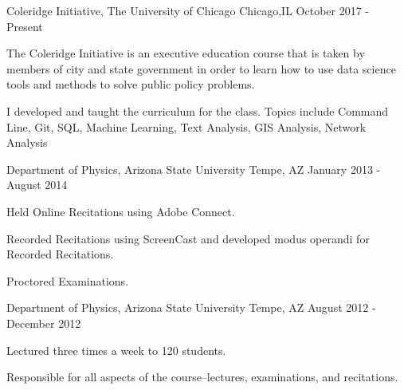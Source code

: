 

\begin{cventries}


    {Coleridge Initiative, The University of Chicago} %
    {Chicago,IL} %
    {October 2017 - Present} %
    {\begin{cvitems}\item {The Coleridge Initiative is an executive education course that is taken by members of city and state government in order to learn how to use data science tools and methods to solve public policy problems.}\item {I developed and taught the curriculum for the class. Topics include Command Line, Git, SQL, Machine Learning, Text Analysis, GIS Analysis, Network Analysis}\end{cvitems}}


    {Department of Physics, Arizona State University} %
    {Tempe, AZ} %
    {January 2013 - August 2014} %
    {
      \begin{cvitems} %
        \item {Held Online Recitations using Adobe Connect.}
        \item {Recorded Recitations using ScreenCast and developed modus operandi for Recorded Recitations.}
        \item {Proctored Examinations.}
      \end{cvitems}
    }

    {Department of Physics, Arizona State University} %
    {Tempe, AZ} %
    {August 2012 - December 2012} %
    {
      \begin{cvitems} %
        \item {Lectured three times a week to 120 students.}
        \item {Responsible for all aspects of the course--lectures, examinations, and recitations.}
      \end{cvitems}
    }


\end{cventries}
